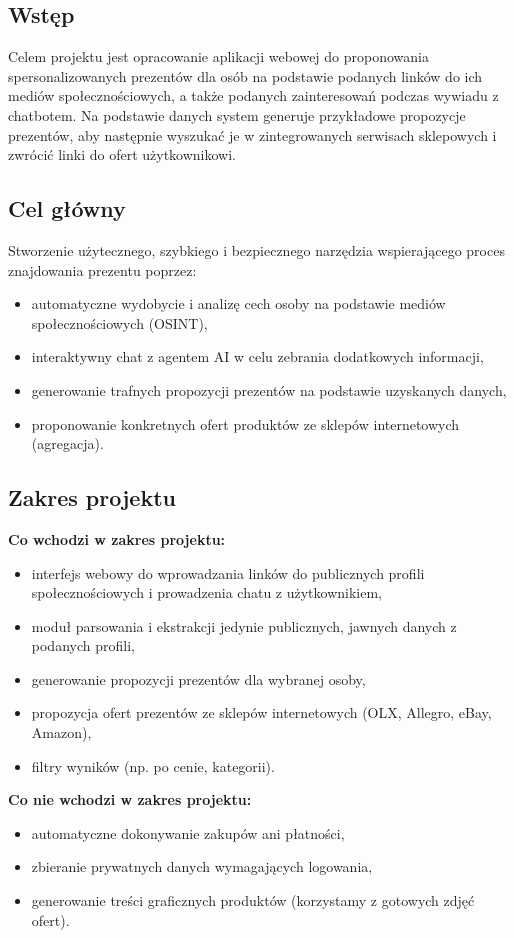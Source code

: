\documentclass[12pt,a4paper]{article}
\begin{document}
\subsection{Wstęp}
Celem projektu jest opracowanie aplikacji webowej do proponowania spersonalizowanych prezentów dla osób na podstawie podanych linków do ich mediów społecznościowych, a także podanych zainteresowań podczas wywiadu z chatbotem. Na podstawie danych system generuje przykładowe propozycje prezentów, aby następnie wyszukać je w zintegrowanych serwisach sklepowych i zwrócić linki do ofert użytkownikowi.

\subsection{Cel główny}
Stworzenie użytecznego, szybkiego i bezpiecznego narzędzia wspierającego proces znajdowania prezentu poprzez:
\begin{itemize}
    \item automatyczne wydobycie i analizę cech osoby na podstawie mediów społecznościowych (OSINT),
    \item interaktywny chat z agentem AI w celu zebrania dodatkowych informacji,
    \item generowanie trafnych propozycji prezentów na podstawie uzyskanych danych,
    \item proponowanie konkretnych ofert produktów ze sklepów internetowych (agregacja).
\end{itemize}

\subsection{Zakres projektu}
\textbf{Co wchodzi w zakres projektu:}
\begin{itemize}
    \item interfejs webowy do wprowadzania linków do publicznych profili społecznościowych i prowadzenia chatu z użytkownikiem,
    \item moduł parsowania i ekstrakcji jedynie publicznych, jawnych danych z podanych profili,
    \item generowanie propozycji prezentów dla wybranej osoby,
    \item propozycja ofert prezentów ze sklepów internetowych (OLX, Allegro, eBay, Amazon),
    \item filtry wyników (np. po cenie, kategorii).
\end{itemize}

\textbf{Co nie wchodzi w zakres projektu:}
\begin{itemize}
    \item automatyczne dokonywanie zakupów ani płatności,
    \item zbieranie prywatnych danych wymagających logowania,
    \item generowanie treści graficznych produktów (korzystamy z gotowych zdjęć ofert).
\end{itemize}
\end{document}

